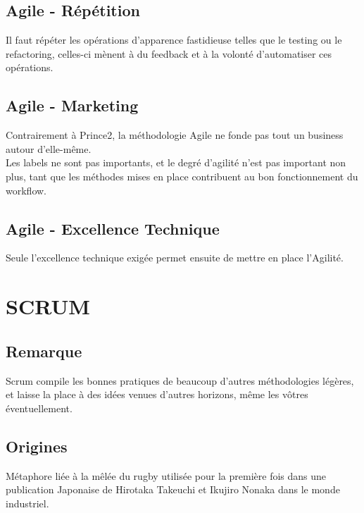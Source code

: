 \documentclass{report}
\begin{document}
	\section{Agile - Répétition}

		Il faut répéter les opérations d'apparence fastidieuse telles que le testing ou le refactoring, celles-ci mènent à du feedback et à la volonté d'automatiser ces opérations.\\

	\section{Agile - Marketing}

		Contrairement à Prince2, la méthodologie Agile ne fonde pas tout un business autour d'elle-même.\\

		Les labels ne sont pas importants, et le degré d'agilité n'est pas important non plus, tant que les méthodes mises en place contribuent au bon fonctionnement du workflow.\\

	\section{Agile - Excellence Technique}

		Seule l'excellence technique exigée permet ensuite de mettre en place l'Agilité.\\

\chapter{SCRUM}

	\section{Remarque}

		Scrum compile les bonnes pratiques de beaucoup d'autres méthodologies légères, et laisse la place à des idées venues d'autres horizons, même les vôtres éventuellement.\\

	\section{Origines}

		Métaphore liée à la mêlée du rugby utilisée pour la première fois dans une publication Japonaise de Hirotaka Takeuchi et Ikujiro Nonaka dans le monde industriel.\\
\end{document}
